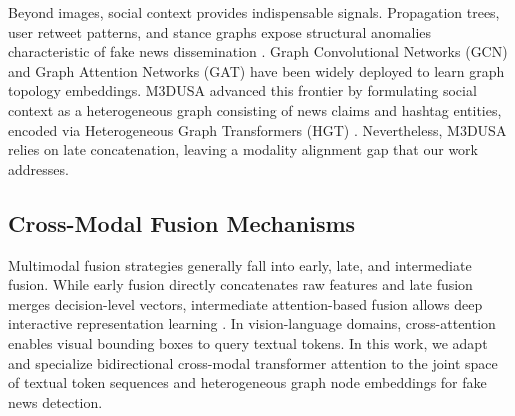 \documentclass[conference]{IEEEtran}
\begin{document}
Beyond images, social context provides indispensable signals. Propagation trees, user retweet patterns, and stance graphs expose structural anomalies characteristic of fake news dissemination \cite{bian2020bigcn}. Graph Convolutional Networks (GCN) and Graph Attention Networks (GAT) \cite{velickovic2018gat, brody2022gatv2} have been widely deployed to learn graph topology embeddings. M3DUSA \cite{martirano2025m3dusa} advanced this frontier by formulating social context as a heterogeneous graph consisting of news claims and hashtag entities, encoded via Heterogeneous Graph Transformers (HGT) \cite{hu2020heterogeneous}. Nevertheless, M3DUSA relies on late concatenation, leaving a modality alignment gap that our work addresses.

\subsection{Cross-Modal Fusion Mechanisms}
Multimodal fusion strategies generally fall into early, late, and intermediate fusion. While early fusion directly concatenates raw features and late fusion merges decision-level vectors, intermediate attention-based fusion allows deep interactive representation learning \cite{vaswani2017attention, jaegle2021perceiver}. In vision-language domains, cross-attention enables visual bounding boxes to query textual tokens. In this work, we adapt and specialize bidirectional cross-modal transformer attention to the joint space of textual token sequences and heterogeneous graph node embeddings for fake news detection.

\begin{table}[t]
\caption{Positioning Against Related Fake News Detection Architectures}
\label{tab:positioning}
\centering
{}
\end{table}
\end{document}
